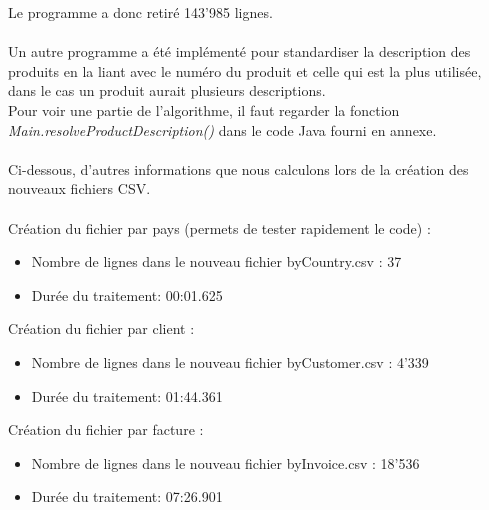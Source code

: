 \documentclass[a4paper]{article}
\begin{document}
\vspace{6pt}
Le programme a donc retiré 143'985 lignes.
\\\\
Un autre programme a été implémenté pour standardiser la description des produits en la liant avec le numéro du produit et celle qui est la plus utilisée, dans le cas un produit aurait plusieurs descriptions. \\
Pour voir une partie de l'algorithme, il faut regarder la fonction \textit{Main.resolveProductDescription()} dans le code Java fourni en annexe.
\\\\
Ci-dessous, d'autres informations que nous calculons lors de la création des nouveaux fichiers CSV.
\\\\
Création du fichier par pays (permets de tester rapidement le code) :
\begin{itemize}
	\item Nombre de lignes dans le nouveau fichier byCountry.csv : 37
	\item Durée du traitement: 00:01.625
\end{itemize}
\vspace{6pt}

Création du fichier par client :
\begin{itemize}
	\item Nombre de lignes dans le nouveau fichier byCustomer.csv : 4'339
	\item Durée du traitement: 01:44.361
\end{itemize}

\vspace{6pt}

Création du fichier par facture :
\begin{itemize}
	\item Nombre de lignes dans le nouveau fichier byInvoice.csv : 18'536
	\item Durée du traitement: 07:26.901
\end{itemize}

\vspace{6pt}
\end{document}
